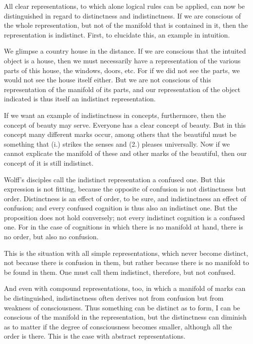 All clear representations, to which alone logical rules can be applied,
can now be distinguished in regard to distinctness and indistinctness.
If we are conscious of the whole representation,
but not of the manifold that is contained in it,
then the representation is indistinct.
First, to elucidate this, an example in intuition.

    We glimpse a country house in the distance.
    If we are conscious that the intuited object is a house,
    then we must necessarily have a representation of
    the various parts of this house, the windows, doors, etc.
    For if we did not see the parts, we would not see the house itself either.
    But we are not conscious of this representation of the manifold of its parts,
    and our representation of the object indicated is thus itself an indistinct representation.

If we want an example of indistinctness in concepts, furthermore, then
the concept of beauty may serve. Everyone has a clear concept of beauty.
But in this concept many different marks occur, among others that the
beautiful must be something that (i.) strikes the senses and (2.) pleases
universally. Now if we cannot explicate the manifold of these and other
marks of the beautiful, then our concept of it is still indistinct.

    Wolff's disciples call the indistinct representation a confused one. But
    this expression is not fitting, because the opposite of confusion is not
    distinctness but order. Distinctness is an effect of order, to be sure, and
    indistinctness an effect of confusion; and every confused cognition is thus
    also an indistinct one. But the proposition does not hold conversely; not
    every indistinct cognition is a confused one. For in the case of cognitions
    in which there is no manifold at hand, there is no order, but also no
    confusion.

This is the situation with all simple representations, which never become distinct,
not because there is confusion in them,
but rather because there is no manifold to be found in them.
One must call them indistinct, therefore, but not confused.

And even with compound representations, too, in which
a manifold of marks can be distinguished,
indistinctness often derives not from confusion
but from weakness of consciousness.
Thus something can be distinct as to form,
I can be conscious of the manifold in the representation,
but the distinctness can diminish as to matter if
the degree of consciousness becomes smaller,
although all the order is there.
This is the case with abstract representations.

